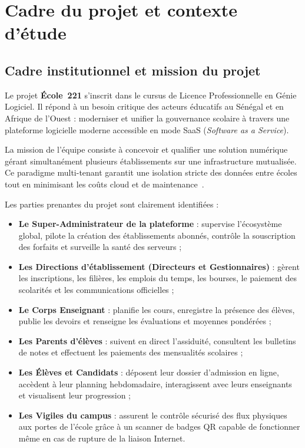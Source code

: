 \chapter{Cadre du projet et contexte d'étude}

\section{Cadre institutionnel et mission du projet}

Le projet \textbf{École~221} s'inscrit dans le cursus de Licence Professionnelle en Génie Logiciel. Il répond à un besoin critique des acteurs éducatifs au Sénégal et en Afrique de l'Ouest : moderniser et unifier la gouvernance scolaire à travers une plateforme logicielle moderne accessible en mode SaaS (\emph{Software as a Service}).

La mission de l'équipe consiste à concevoir et qualifier une solution numérique gérant simultanément plusieurs établissements sur une infrastructure mutualisée. Ce paradigme multi-tenant garantit une isolation stricte des données entre écoles tout en minimisant les coûts cloud et de maintenance~\cite{chong2006saas}.

Les parties prenantes du projet sont clairement identifiées :
\begin{itemize}
  \item \textbf{Le Super-Administrateur de la plateforme} : supervise l'écosystème global, pilote la création des établissements abonnés, contrôle la souscription des forfaits et surveille la santé des serveurs ;
  \item \textbf{Les Directions d'établissement (Directeurs et Gestionnaires)} : gèrent les inscriptions, les filières, les emplois du temps, les bourses, le paiement des scolarités et les communications officielles ;
  \item \textbf{Le Corps Enseignant} : planifie les cours, enregistre la présence des élèves, publie les devoirs et renseigne les évaluations et moyennes pondérées ;
  \item \textbf{Les Parents d'élèves} : suivent en direct l'assiduité, consultent les bulletins de notes et effectuent les paiements des mensualités scolaires ;
  \item \textbf{Les Élèves et Candidats} : déposent leur dossier d'admission en ligne, accèdent à leur planning hebdomadaire, interagissent avec leurs enseignants et visualisent leur progression ;
  \item \textbf{Les Vigiles du campus} : assurent le contrôle sécurisé des flux physiques aux portes de l'école grâce à un scanner de badges QR capable de fonctionner même en cas de rupture de la liaison Internet.
\end{itemize}

